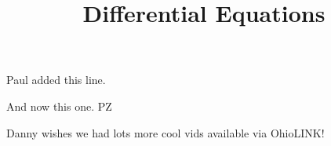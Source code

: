 \documentclass{article}
\title{Differential Equations}
\begin{document}
\maketitle

Paul added this line.

And now this one.  PZ

Danny wishes we had lots more cool vids available via OhioLINK!
\end{document}
